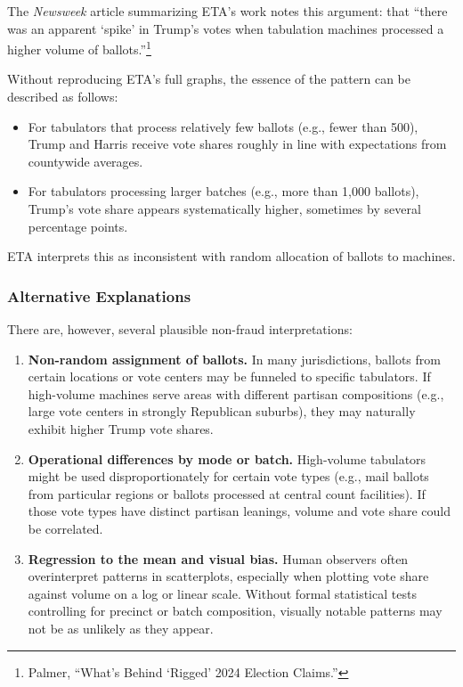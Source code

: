 \documentclass[12pt]{article}
\begin{document}
The \emph{Newsweek} article summarizing ETA's work notes this argument: that \enquote{there was an apparent `spike' in Trump's votes when tabulation machines processed a higher volume of ballots.}\footnote{Palmer, ``What's Behind `Rigged' 2024 Election Claims.''}

Without reproducing ETA's full graphs, the essence of the pattern can be described as follows:

\begin{itemize}
    \item For tabulators that process relatively few ballots (e.g., fewer than 500), Trump and Harris receive vote shares roughly in line with expectations from countywide averages.
    \item For tabulators processing larger batches (e.g., more than 1,000 ballots), Trump's vote share appears systematically higher, sometimes by several percentage points.
\end{itemize}

ETA interprets this as inconsistent with random allocation of ballots to machines.

\subsubsection{Alternative Explanations}

There are, however, several plausible non-fraud interpretations:

\begin{enumerate}
    \item \textbf{Non-random assignment of ballots.} In many jurisdictions, ballots from certain locations or vote centers may be funneled to specific tabulators. If high-volume machines serve areas with different partisan compositions (e.g., large vote centers in strongly Republican suburbs), they may naturally exhibit higher Trump vote shares.

    \item \textbf{Operational differences by mode or batch.} High-volume tabulators might be used disproportionately for certain vote types (e.g., mail ballots from particular regions or ballots processed at central count facilities). If those vote types have distinct partisan leanings, volume and vote share could be correlated.

    \item \textbf{Regression to the mean and visual bias.} Human observers often overinterpret patterns in scatterplots, especially when plotting vote share against volume on a log or linear scale. Without formal statistical tests controlling for precinct or batch composition, visually notable patterns may not be as unlikely as they appear.
\end{enumerate}
\end{document}
